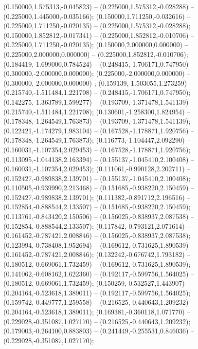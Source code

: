  (0.150000,1.575313,-0.045823) -- (0.225000,1.575312,-0.028288) -- (0.225000,1.445000,-0.035166);
 (0.150000,1.711250,-0.032616) -- (0.225000,1.711250,-0.020135) -- (0.225000,1.575312,-0.028288);
 (0.150000,1.852812,-0.017341) -- (0.225000,1.852812,-0.010706) -- (0.225000,1.711250,-0.020135);
 (0.150000,2.000000,0.000000) -- (0.225000,2.000000,0.000000) -- (0.225000,1.852812,-0.010706);
 (0.184419,-1.699000,0.784524) -- (0.248415,-1.706171,0.747950) -- (0.300000,-2.000000,0.000000);
 (0.225000,-2.000000,0.000000) -- (0.300000,-2.000000,0.000000) ;
 (0.159139,-1.503055,1.273259) -- (0.215740,-1.511484,1.221708) -- (0.248415,-1.706171,0.747950);
 (0.142275,-1.363789,1.599277) -- (0.193709,-1.371478,1.541139) -- (0.215740,-1.511484,1.221708);
 (0.130601,-1.258300,1.824954) -- (0.178348,-1.264549,1.763873) -- (0.193709,-1.371478,1.541139);
 (0.122421,-1.174279,1.983104) -- (0.167528,-1.178871,1.920756) -- (0.178348,-1.264549,1.763873);
 (0.116773,-1.104447,2.092290) -- (0.160031,-1.107354,2.029453) -- (0.167528,-1.178871,1.920756);
 (0.113095,-1.044138,2.163394) -- (0.155137,-1.045410,2.100408) -- (0.160031,-1.107354,2.029453);
 (0.111061,-0.990128,2.202711) -- (0.152427,-0.989838,2.139701) -- (0.155137,-1.045410,2.100408);
 (0.110505,-0.939990,2.213468) -- (0.151685,-0.938220,2.150459) -- (0.152427,-0.989838,2.139701);
 (0.111382,-0.891712,2.196516) -- (0.152854,-0.888544,2.133507) -- (0.151685,-0.938220,2.150459);
 (0.113761,-0.843420,2.150506) -- (0.156025,-0.838937,2.087538) -- (0.152854,-0.888544,2.133507);
 (0.117842,-0.793121,2.071614) -- (0.161452,-0.787421,2.008846) -- (0.156025,-0.838937,2.087538);
 (0.123994,-0.738408,1.952694) -- (0.169612,-0.731625,1.890539) -- (0.161452,-0.787421,2.008846);
 (0.132242,-0.676742,1.793182) -- (0.180512,-0.669061,1.732459) -- (0.169612,-0.731625,1.890539);
 (0.141062,-0.608162,1.622360) -- (0.192117,-0.599756,1.564025) -- (0.180512,-0.669061,1.732459);
 (0.150259,-0.532527,1.443907) -- (0.204164,-0.523618,1.389011) -- (0.192117,-0.599756,1.564025);
 (0.159742,-0.449777,1.259558) -- (0.216525,-0.440643,1.209232) -- (0.204164,-0.523618,1.389011);
 (0.169381,-0.360118,1.071770) -- (0.229028,-0.351087,1.027170) -- (0.216525,-0.440643,1.209232);
 (0.179003,-0.264100,0.883803) -- (0.241449,-0.255531,0.846036) -- (0.229028,-0.351087,1.027170);
